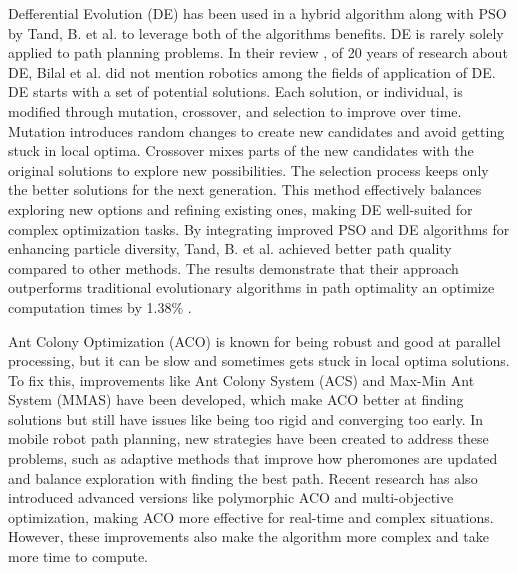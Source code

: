 Defferential Evolution (DE) has been used in a hybrid algorithm along with PSO by Tand, B. et al. \cite{R43} to leverage 
both of the algorithms benefits. DE is rarely solely applied to path planning problems. In their review \cite{R37}
, of 20 years of research about DE, Bilal et al. did not mention robotics among the fields of application of DE. 
DE starts with a set of potential solutions. Each solution, or individual, is modified 
through mutation, crossover, and selection to improve over time. Mutation introduces random changes to create new 
candidates and avoid getting stuck in local optima. Crossover mixes parts of the new candidates with the original 
solutions to explore new possibilities. The selection process keeps only the better solutions for the next generation. 
This method effectively balances exploring new options and refining existing ones, making DE well-suited for complex 
optimization tasks.
By integrating improved PSO and DE algorithms for enhancing particle diversity, Tand, B. et al. achieved better 
path quality compared to other methods. The results demonstrate that their approach outperforms traditional 
evolutionary algorithms in path optimality an optimize computation times by 1.38\% \cite{R43}. 

Ant Colony Optimization (ACO) is known for being robust and good at parallel processing, but it can be slow and 
sometimes gets stuck in local optima solutions. To fix this, improvements like Ant Colony System (ACS) 
and Max-Min Ant System (MMAS) have been developed, which make ACO better at finding solutions but still have 
issues like being too rigid and converging too early. In mobile robot path planning, new strategies have been 
created to address these problems, such as adaptive methods that improve how pheromones are updated and balance 
exploration with finding the best path. Recent research has also introduced advanced versions like polymorphic 
ACO and multi-objective optimization, making ACO more effective for real-time and complex situations. However, 
these improvements also make the algorithm more complex and take more time to compute.


